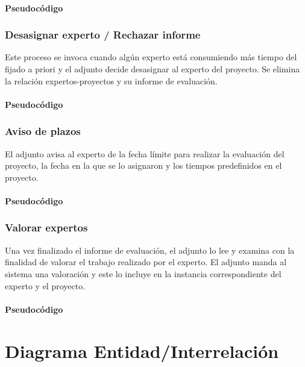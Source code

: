 \documentclass[12pt,a4paper,titlepage,spanish,twoside]{book}
\begin{document}
\subsubsection{Pseudocódigo}


\subsection{Desasignar experto / Rechazar informe}
Este proceso se invoca cuando algún experto está consumiendo más tiempo del 
fijado a priori y el adjunto decide desasignar al experto del proyecto. Se 
elimina la relación expertos-proyectos y su informe de evaluación.

\subsubsection{Pseudocódigo}


\subsection{Aviso de plazos}
El adjunto avisa al experto de la fecha límite para realizar la evaluación del 
proyecto, la fecha en la que se lo asignaron y los tiempos predefinidos en el 
proyecto.

\subsubsection{Pseudocódigo}


\subsection{Valorar expertos}
Una vez finalizado el informe de evaluación, el adjunto lo lee y examina con la 
finalidad de valorar el trabajo realizado por el experto. El adjunto manda al
sistema una valoración y este lo incluye en la instancia correspondiente del 
experto y el proyecto.

\subsubsection{Pseudocódigo}


\chapter{Diagrama Entidad/Interrelación}
\newpage
{}
\end{document}
